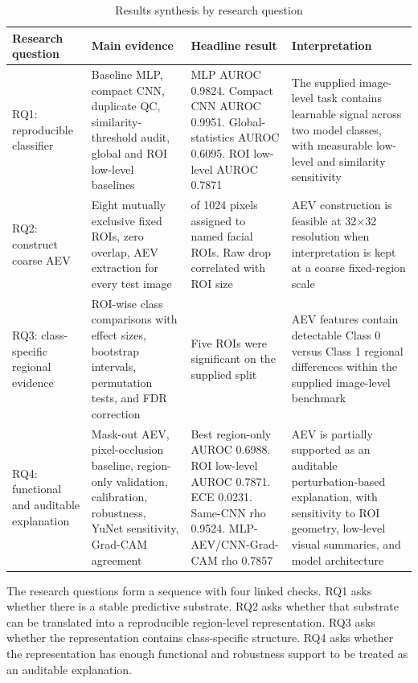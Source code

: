 \begin{table}[H]
\centering
\scriptsize
\caption{Results synthesis by research question}
\begin{tabularx}{\textwidth}{>{\raggedright\arraybackslash}X>{\raggedright\arraybackslash}X>{\raggedright\arraybackslash}X>{\raggedright\arraybackslash}X}
\toprule
Research question & Main evidence & Headline result & Interpretation \\
\midrule
RQ1: reproducible classifier & Baseline MLP, compact CNN, duplicate QC, similarity-threshold audit, global and ROI low-level baselines & MLP AUROC 0.9824. Compact CNN AUROC 0.9951. Global-statistics AUROC 0.6095. ROI low-level AUROC 0.7871 & The supplied image-level task contains learnable signal across two model classes, with measurable low-level and similarity sensitivity \\
RQ2: construct coarse AEV & Eight mutually exclusive fixed ROIs, zero overlap, AEV extraction for every test image & 840 of 1024 pixels assigned to named facial ROIs. Raw drop correlated with ROI size & AEV construction is feasible at 32$\times$32 resolution when interpretation is kept at a coarse fixed-region scale \\
RQ3: class-specific regional evidence & ROI-wise class comparisons with effect sizes, bootstrap intervals, permutation tests, and FDR correction & Five ROIs were significant on the supplied split & AEV features contain detectable Class 0 versus Class 1 regional differences within the supplied image-level benchmark \\
RQ4: functional and auditable explanation & Mask-out AEV, pixel-occlusion baseline, region-only validation, calibration, robustness, YuNet sensitivity, Grad-CAM agreement & Best region-only AUROC 0.6988. ROI low-level AUROC 0.7871. ECE 0.0231. Same-CNN rho 0.9524. MLP-AEV/CNN-Grad-CAM rho 0.7857 & AEV is partially supported as an auditable perturbation-based explanation, with sensitivity to ROI geometry, low-level visual summaries, and model architecture \\
\bottomrule
\end{tabularx}
\end{table}

The research questions form a sequence with four linked checks. RQ1 asks whether there is a stable predictive substrate. RQ2 asks whether that substrate can be translated into a reproducible region-level representation. RQ3 asks whether the representation contains class-specific structure. RQ4 asks whether the representation has enough functional and robustness support to be treated as an auditable explanation.


